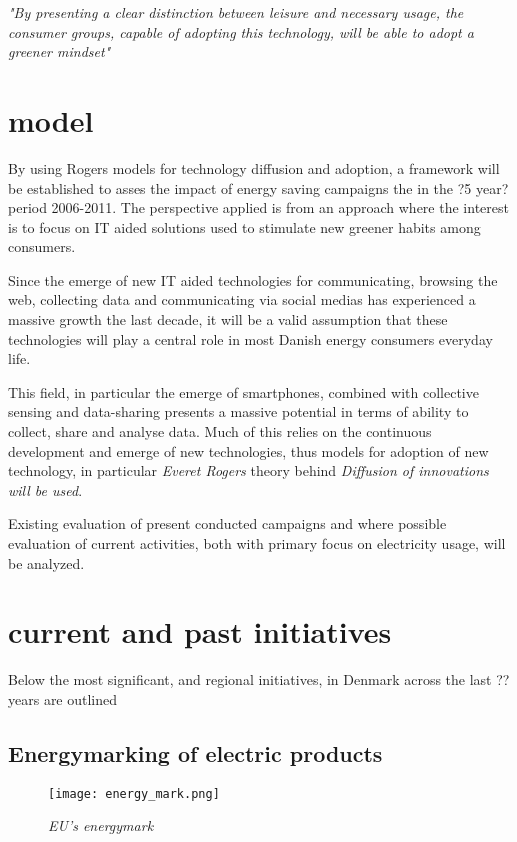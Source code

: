 \documentclass[journal]{IEEEtran}
\begin{document}
\textit{"By presenting a clear distinction between leisure and necessary usage, the consumer groups, capable of adopting this technology, will be able to adopt a greener mindset"}

\section{model}
By using Rogers models for technology diffusion and adoption, a framework will be established to asses the impact of energy saving campaigns the in the ?5 year? period 2006-2011.
The perspective applied is from an approach where the interest is to focus on IT aided solutions used to stimulate new greener habits among consumers.

Since the emerge of new IT aided technologies for communicating,  browsing the web, collecting data and communicating via social medias has experienced a massive growth the last decade, it will be a valid assumption that these technologies will play a central role in most Danish energy consumers everyday life.

This field, in particular the emerge of smartphones, combined with collective sensing and data-sharing presents a massive potential in terms of ability to collect, share and analyse data. Much of this relies on the continuous development and emerge of new technologies, thus models for adoption of new technology, in particular \textit{Everet Rogers } theory behind \textit{Diffusion of innovations will be used}.

Existing evaluation of present conducted campaigns and where possible evaluation of current activities, both with primary focus on electricity usage, will be analyzed.


\section{current and past initiatives}
Below the most significant, and regional initiatives, in Denmark across the last ?? years are outlined

\subsection{Energymarking of electric products}
\begin{figure}
\texttt{[image: energy\_mark.png]}
\caption{\textit{EU's energymark}}			
\label{fig:emark} %
\end{figure}
\end{document}
